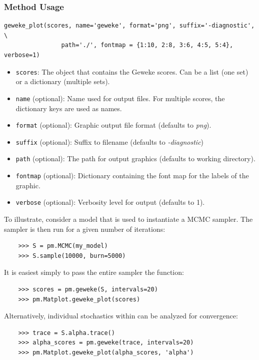 \subsubsection*{Method Usage}
\begin{verbatim}
geweke_plot(scores, name='geweke', format='png', suffix='-diagnostic', \
                path='./', fontmap = {1:10, 2:8, 3:6, 4:5, 5:4}, verbose=1)
\end{verbatim}
\begin{itemize}

\item \verb=scores=: The object that contains the Geweke scores. Can be a list (one set) or a dictionary (multiple sets).

\item \verb=name= (optional): Name used for output files. For multiple scores, the dictionary keys are used as names.

\item \verb=format= (optional): Graphic output file format (defaults to \emph{png}).

\item \verb=suffix= (optional): Suffix to filename (defaults to \emph{-diagnostic})

\item \verb=path= (optional): The path for output graphics (defaults to working directory).

\item \verb=fontmap= (optional): Dictionary containing the font map for the labels of the graphic.

\item \verb=verbose= (optional): Verbosity level for output (defaults to 1).
\end{itemize}

To illustrate, consider a model  that is used to instantiate a MCMC sampler. The sampler is then run for a given number of iterations:
\begin{verbatim}
	>>> S = pm.MCMC(my_model)
	>>> S.sample(10000, burn=5000)
\end{verbatim}
It is easiest simply to pass the entire sampler  the  function:
\begin{verbatim}
	>>> scores = pm.geweke(S, intervals=20)
	>>> pm.Matplot.geweke_plot(scores)
\end{verbatim}
Alternatively, individual stochastics within  can be analyzed for convergence:
\begin{verbatim}
	>>> trace = S.alpha.trace()
	>>> alpha_scores = pm.geweke(trace, intervals=20)
	>>> pm.Matplot.geweke_plot(alpha_scores, 'alpha')
\end{verbatim}

